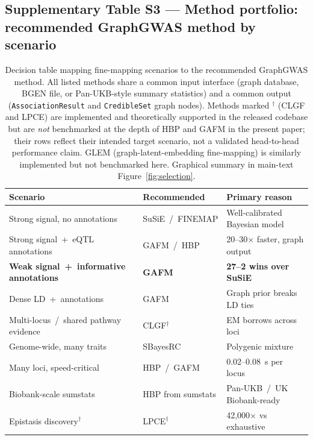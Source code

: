 \clearpage

\subsection*{Supplementary Table S3 --- Method portfolio: recommended GraphGWAS method by scenario}

\begin{table}[htbp]
\centering
\small
\begin{tabular}{p{}ll}
\toprule
Scenario & Recommended & Primary reason \\
\midrule
Strong signal, no annotations & SuSiE~/~FINEMAP & Well-calibrated Bayesian model \\
Strong signal~+~eQTL annotations & GAFM~/~HBP & 20--30$\times$ faster, graph output \\
\textbf{Weak signal~+~informative annotations} & \textbf{GAFM} & \textbf{27--2 wins over SuSiE} \\
Dense LD~+~annotations & GAFM & Graph prior breaks LD ties \\
Multi-locus~/~shared pathway evidence & CLGF$^{\dagger}$ & EM borrows across loci \\
Genome-wide, many traits & SBayesRC & Polygenic mixture \\
Many loci, speed-critical & HBP~/~GAFM & 0.02--0.08~s per locus \\
Biobank-scale sumstats & HBP from sumstats & Pan-UKB~/~UK Biobank-ready \\
Epistasis discovery$^{\dagger}$ & LPCE$^{\dagger}$ & 42{,}000$\times$ vs exhaustive \\
\bottomrule
\end{tabular}
\caption{Decision table mapping fine-mapping scenarios to the
recommended GraphGWAS method. All listed methods share a common
input interface (graph database, BGEN file, or Pan-UKB-style summary
statistics) and a common output (\texttt{AssociationResult} and
\texttt{CredibleSet} graph nodes). Methods marked $^{\dagger}$
(CLGF and LPCE) are implemented and theoretically supported in the
released codebase but are \emph{not} benchmarked at the depth of
HBP and GAFM in the present paper; their rows reflect their intended
target scenario, not a validated head-to-head performance claim.
GLEM (graph-latent-embedding fine-mapping) is similarly implemented
but not benchmarked here. Graphical summary in main-text
Figure~\ref{fig:selection}.}
\label{tab:sup_portfolio}
\end{table}

